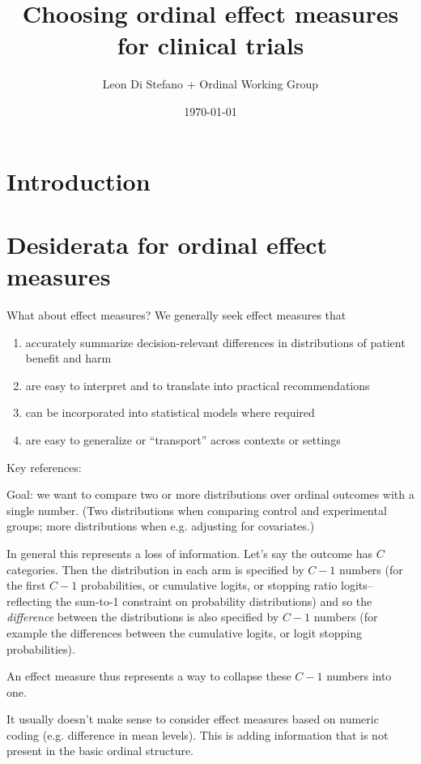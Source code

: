 \documentclass[
  11pt,
  fleqn
]{article}
\title{Choosing ordinal effect measures for clinical trials}
\author{Leon Di Stefano + Ordinal
Working Group}
\date{\today}
\begin{document}
\maketitle

\tableofcontents
\newpage

\section{Introduction}

\section{Desiderata for ordinal effect measures}

What about effect measures? We generally seek effect measures that
\begin{enumerate}
  \item accurately summarize decision-relevant differences in distributions of
    patient benefit and harm
  \item are easy to interpret and to translate into practical recommendations
  \item can be incorporated into statistical models where required
  \item are easy to generalize or ``transport'' across contexts or settings
\end{enumerate}

Key references:
\citet{agrestiMeasuresNominalOrdinalAssociation1981,agrestiOrdinalProbabilityEffect2017a,
agrestiSimpleWaysInterpret2018a}

Goal: we want to compare two or more distributions over ordinal
outcomes with a single number. (Two distributions when comparing control and
experimental groups; more distributions when e.g. adjusting for covariates.)

In general this represents a loss of information. Let's say the
outcome has $C$ categories. Then the distribution in each
arm is specified by $C-1$ numbers (for the first $C-1$ probabilities,
  or cumulative logits, or stopping ratio logits--reflecting the
sum-to-1 constraint on probability distributions) and so the
\emph{difference} between the distributions is also specified by
$C-1$ numbers (for example the differences between the cumulative
logits, or logit stopping probabilities).

An effect measure thus represents a way to collapse these $C-1$
numbers into one.

It usually doesn't make sense to consider effect measures based on
numeric coding (e.g. difference in mean levels). This is adding
information that is not present in the basic ordinal structure.
\end{document}
